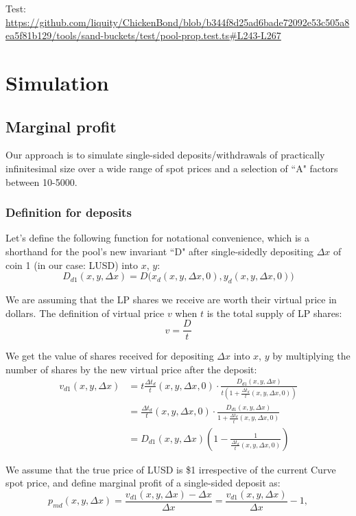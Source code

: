 \documentclass{article}
\begin{document}
Test:
\url{https://github.com/liquity/ChickenBond/blob/b344f8d25ad6bade72092e53c505a8ea5f81b129/tools/sand-buckets/test/pool-prop.test.ts#L243-L267}

\section{Simulation}

\subsection{Marginal profit}

Our approach is to simulate single-sided deposits/withdrawals of practically infinitesimal size over a wide range of spot prices and a selection of ``A" factors between 10-5000.

\subsubsection{Definition for deposits}

Let's define the following function for notational convenience, which is a shorthand for the pool's new invariant ``D" after single-sidedly depositing $\Delta{x}$ of coin 1 (in our case: LUSD) into $x$, $y$:
\[
D_{d1}(x, y, \Delta{x}) = D\bigl(x_d(x, y, \Delta{x}, 0), y_d(x, y, \Delta{x}, 0)\bigr)
\]

We are assuming that the LP shares we receive are worth their virtual price in dollars. The definition of virtual price $v$ when $t$ is the total supply of LP shares:
\[
v = \frac{D}{t}
\]

We get the value of shares received for depositing $\Delta{x}$ into $x$, $y$ by multiplying the number of shares by the new virtual price after the deposit:
\[
\begin{split}
  v_{d1}(x, y, \Delta{x}) &= t \tfrac{\Delta{t}_d}{t}(x, y, \Delta{x}, 0) \cdot \frac{D_{d1}(x, y, \Delta{x})}{t \left(1 + \tfrac{\Delta{t}_d}{t}(x, y, \Delta{x}, 0)\right)} \\
  &= \tfrac{\Delta{t}_d}{t}(x, y, \Delta{x}, 0) \cdot \frac{D_{d1}(x, y, \Delta{x})}{1 + \tfrac{\Delta{t}_d}{t}(x, y, \Delta{x}, 0)} \\
  &= D_{d1}(x, y, \Delta{x}) \left(1 - \frac{1}{\tfrac{\Delta{t}_d}{t}(x, y, \Delta{x}, 0)}\right)
\end{split}
\]

We assume that the true price of LUSD is \$1 irrespective of the current Curve spot price, and define marginal profit of a single-sided deposit as:
\[
p_{md}(x, y, \Delta{x}) = \frac{v_{d1}(x, y, \Delta{x}) - \Delta{x}}{\Delta{x}} = \frac{v_{d1}(x, y, \Delta{x})}{\Delta{x}} - 1,
\]
\end{document}
